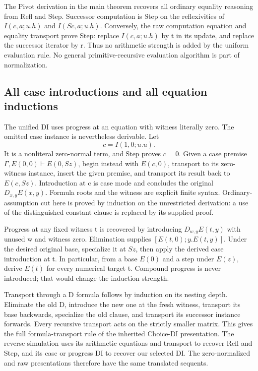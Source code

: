 \documentclass[11pt,letterpaper]{article}
\theoremstyle{definition}
\begin{document}
The Pivot derivation in the main theorem recovers all ordinary equality
reasoning from Refl and Step. Successor computation is Step on the
reflexivities of \(I(c,a;u.h)\) and \(I(Sc,a;u.h)\). Conversely,
the raw computation equation and equality transport prove Step:
replace \(I(c,a;u.h)\) by t in its update, and replace the successor
iterator by r. Thus no arithmetic strength is added by the uniform
evaluation rule. No general primitive-recursive evaluation algorithm
is part of normalization.

\subsection{All case introductions and all equation inductions}

The unified DI uses progress at an equation with witness literally zero.
The omitted case instance is nevertheless derivable. Let
\[
 c=I(1,0;u.u).
\]
It is a nonliteral zero-normal term, and Step proves \(c=0\). Given a
case premise \(\Gamma,E(0,0)\vdash E(0,Sz)\), begin instead with
\(E(c,0)\), transport to its zero-witness instance, insert the given
premise, and transport its result back to \(E(c,Sz)\). Introduction at
c is case mode and concludes the original \(D_{x,y}E(x,y)\). Formula
roots and the witness are explicit finite syntax. Ordinary-assumption
cut here is proved by induction on the unrestricted derivation: a use
of the distinguished constant clause is replaced by its supplied proof.

Progress at any fixed witness t is recovered by introducing
\(D_{w,y}E(t,y)\) with unused w and witness zero. Elimination supplies
\([E(t,0);y.E(t,y)]\). Under the desired original base, specialize it
at \(Sz\), then apply the derived case introduction at t. In
particular, from a base \(E(0)\) and a step under \(E(z)\), derive
\(E(t)\) for every numerical target t. Compound progress is never
introduced; that would change the induction strength.

Transport through a D formula follows by induction on its nesting
depth. Eliminate the old D, introduce the new one at the fresh witness,
transport its base backwards, specialize the old clause, and transport
its successor instance forwards. Every recursive transport acts on the
strictly smaller matrix. This gives the full formula-transport rule of
the inherited Choice-DI presentation. The reverse simulation uses its
arithmetic equations and transport to recover Refl and Step, and its
case or progress DI to recover our selected DI. The zero-normalized
and raw presentations therefore have the same translated sequents.
\end{document}
